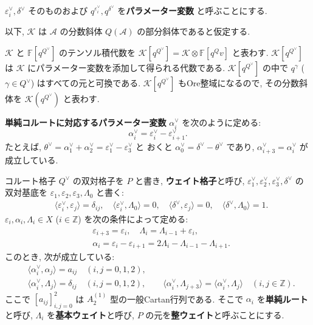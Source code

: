 \documentclass[12pt,twoside,dvipdfm]{msjproc}
\newcommand\Z{{\mathbb Z}} %
\newcommand\F{{\mathbb F}} %
\theoremstyle{definition} %
\theoremstyle{definition} %
\theoremstyle{definition} %
\numberwithin{theorem}{section}
\numberwithin{equation}{section}
\numberwithin{figure}{section}
\numberwithin{table}{section}
\newcommand\bra{\langle}
\newcommand\ket{\rangle}
\newcommand\eps{\varepsilon}
\newcommand\A{\mathcal{A}}
\newcommand\K{\mathcal{K}}
\newcommand\ev{\varepsilon^\vee}
\newcommand\av{\alpha^\vee}
\newcommand\dv{\delta^\vee}
\newcommand\Qv{{Q^\vee}}
\begin{document}
$\ev_i,\dv$ そのものおよび $q^{\ev_i},q^{\dv}$ を{\bf パラメーター変数}
と呼ぶことにする.

以下, $\K$ は $\A$ の分数斜体 $Q(\A)$ の部分斜体であると仮定する.

$\K$ と $\F[q^\Qv]$ のテンソル積代数を $\K[q^\Qv]=\K\otimes\F[q^Qv]$ と表わす.
$\K[q^\Qv]$ は $\K$ にパラメーター変数を添加して得られる代数である.
$\K[q^\Qv]$ の中で $q^\gamma$ ($\gamma\in\Qv$) はすべての元と可換である.
$\K[q^\Qv]$ もOre整域になるので, その分数斜体を $\K(q^\Qv)$ と表わす.

{\bf 単純コルートに対応するパラメーター変数} $\av_i$ を次のように定める:
\begin{equation*}
 \av_i = \ev_i-\ev_{i+1}.
\end{equation*}
たとえば, $\theta^\vee=\av_1+\av_2=\ev_1-\ev_3$ と
おくと $\av_0=\dv-\theta^\vee$ であり, $\av_{i+3}=\av_i$ が成立している.


コルート格子 $\Qv$ の双対格子を $P$ と書き, {\bf ウェイト格子}と呼び,  
$\ev_1,\ev_2,\ev_3,\dv$ の双対基底を $\eps_1,\eps_2,\eps_3,\Lambda_0$ と書く:
\begin{align*}
 &
 \bra\ev_i,\eps_j\ket=\delta_{ij}, \quad
 \bra\ev_i,\Lambda_0\ket=0, \quad
 \bra\dv,\eps_j\ket=0, \quad
 \bra\dv,\Lambda_0\ket=1.
\end{align*}
$\eps_i,\alpha_i, \Lambda_i\in X$ ($i\in\Z$) を次の条件によって定める:
\begin{align*}
 &
 \eps_{i+3}=\eps_i, \quad
 \Lambda_i = \Lambda_{i-1} + \eps_i,
 \\ &
 \alpha_i = \eps_i - \eps_{i+1} = 2\Lambda_i-\Lambda_{i-1}-\Lambda_{i+1}.
\end{align*}
このとき, 次が成立している:
\begin{align*}
 &
 \bra\av_i,\alpha_j\ket = a_{ij} \quad (i,j=0,1,2),
 \\ &
 \bra\av_i,\Lambda_j\ket = \delta_{ij} \quad (i,j=0,1,2),
 \qquad
 \bra\av_i,\Lambda_{j+3}\ket=\bra\av_i,\Lambda_j\ket \quad (i,j\in\Z).
\end{align*}
ここで $[a_{ij}]_{i,j=0}^2$ は $A^{(1)}_2$ 型の一般Cartan行列である.
そこで $\alpha_i$ を{\bf 単純ルート}と呼び, 
$\Lambda_i$ を{\bf 基本ウェイト}と呼び, 
$P$ の元を{\bf 整ウェイト}と呼ぶことにする.
\end{document}
